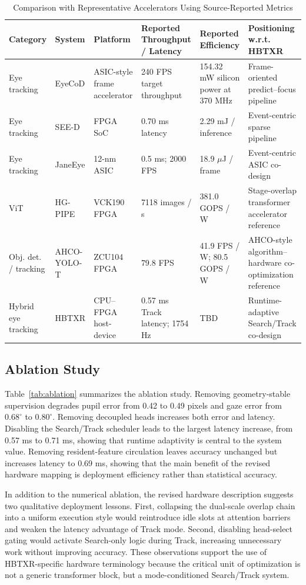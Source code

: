 \documentclass[journal]{IEEEtran}
\begin{document}
\begin{table}[t]
\caption{Comparison with Representative Accelerators Using Source-Reported Metrics}
\label{tab:accel}
\centering
\footnotesize
\begin{tabular}{p{}p{}p{}p{}p{}p{}}
\toprule
Category & System & Platform & Reported Throughput / Latency & Reported Efficiency & Positioning w.r.t. HBTXR \\
\midrule
Eye tracking & EyeCoD & ASIC-style frame accelerator & 240 FPS target throughput & 154.32 mW silicon power at 370 MHz & Frame-oriented predict--focus pipeline \\
Eye tracking & SEE-D & FPGA SoC & 0.70 ms latency & 2.29 mJ / inference & Event-centric sparse pipeline \\
Eye tracking & JaneEye & 12-nm ASIC & 0.5 ms; 2000 FPS & 18.9 $\mu$J / frame & Event-centric ASIC co-design \\
ViT & HG-PIPE & VCK190 FPGA & 7118 images / s & 381.0 GOPS / W & Stage-overlap transformer accelerator reference \\
Obj. det. / tracking & AHCO-YOLO-T & ZCU104 FPGA & 79.8 FPS & 41.9 FPS / W; 80.5 GOPS / W & AHCO-style algorithm--hardware co-optimization reference \\
Hybrid eye tracking & HBTXR & CPU--FPGA host-device & 0.57 ms Track latency; 1754 Hz & TBD & Runtime-adaptive Search/Track co-design \\
\bottomrule
\end{tabular}
\end{table}

\subsection{Ablation Study}
Table~\ref{tab:ablation} summarizes the ablation study. Removing geometry-stable supervision degrades pupil error from 0.42 to 0.49 pixels and gaze error from $0.68^{\circ}$ to $0.80^{\circ}$. Removing decoupled heads increases both error and latency. Disabling the Search/Track scheduler leads to the largest latency increase, from 0.57 ms to 0.71 ms, showing that runtime adaptivity is central to the system value. Removing resident-feature circulation leaves accuracy unchanged but increases latency to 0.69 ms, showing that the main benefit of the revised hardware mapping is deployment efficiency rather than statistical accuracy.

In addition to the numerical ablation, the revised hardware description suggests two qualitative deployment lessons. First, collapsing the dual-scale overlap chain into a uniform execution style would reintroduce idle slots at attention barriers and weaken the latency advantage of Track mode. Second, disabling head-select gating would activate Search-only logic during Track, increasing unnecessary work without improving accuracy. These observations support the use of HBTXR-specific hardware terminology because the critical unit of optimization is not a generic transformer block, but a mode-conditioned Search/Track system.
\end{document}
